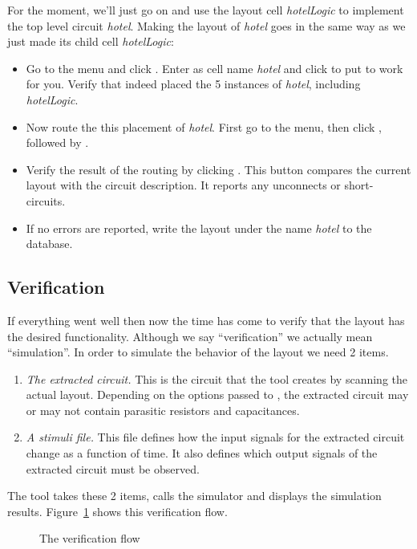 For the moment, we'll just go on and use the layout cell {\sl hotelLogic} to
implement the top level circuit {\sl hotel}. Making the layout of {\sl hotel}
goes in the same way as we just made its child cell {\sl hotelLogic}:
\begin{itemize}
\item
Go to the  menu and click . Enter
as cell name {\sl hotel} and click  to put 
to work for you. Verify that  indeed placed the 5 instances of
{\sl hotel}, including {\sl hotelLogic}. 
\item
Now route the this placement of {\sl hotel}. First go to the 
menu, then click
, followed by . 
\item
Verify the result of the routing by clicking 
. 
This button compares the current layout with the circuit description. It
reports any unconnects or short-circuits. 
\item
If no errors are reported, write the layout under the
name {\sl hotel} to the database.
\end{itemize}

\subsection{Verification}
\label{s-verification}
If everything went well then now the time has come to verify that the layout
has the desired functionality.  Although we say ``verification'' we actually
mean ``simulation''. In order to simulate the behavior of the layout we need 2
items.
\begin{enumerate}
\item {\sl The extracted circuit.\/} This is the circuit that the tool
 creates by scanning the actual layout. Depending on the options
passed to , the extracted circuit may or may not contain parasitic
resistors and capacitances.
\item {\sl A stimuli file.\/} This file defines how the input signals for the
extracted circuit change as a function of time. It also defines which output
signals of the extracted circuit must be observed.
\end{enumerate}
The tool  takes these 2 items, calls the simulator and displays
the simulation results. Figure~\ref{f-hotel-extract} shows this verification
flow.
\begin{figure}[hbt]
\centerline{}
\caption{The verification flow}
\label{f-hotel-extract}
\end{figure}

